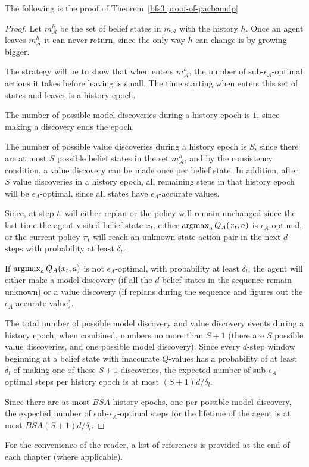 The following is the proof of Theorem~\ref{bfs3:proof-of-pacbamdp}
\begin{proof}
Let $m_\mathcal{A}^h$ be the set of belief states in $m_\mathcal{A}$ with the history $h$. Once an agent leaves $m_\mathcal{A}^h$ it can never return, since the only way $h$ can change is by growing bigger.

The strategy will be to show that when  enters $m_\mathcal{A}^h$, the number of sub-$\epsilon_A$-optimal actions it takes before leaving is small. The time starting when  enters this set of states and leaves is a history epoch.

The number of possible model discoveries during a history epoch is $1$, since making a discovery ends the epoch.

The number of possible value discoveries during a history epoch is $S$, since there are at most $S$ possible belief states in the set $m_\mathcal{A}^h$, and by the consistency condition, a value discovery can be made once per belief state. In addition, after $S$ value discoveries in a history epoch, all remaining steps in that history epoch will be $\epsilon_A$-optimal, since all states have $\epsilon_A$-accurate values.

Since, at step $t$,  will either replan or the policy will remain unchanged since the last time the agent visited belief-state $x_t$, either $\argmax_a Q_A(x_t,a)$ is $\epsilon_A$-optimal, or the current policy $\pi_t$ will reach an unknown state-action pair in the next $d$ steps with probability at least $\delta_l$.

If $\argmax_a Q_A(x_t,a)$ is not $\epsilon_A$-optimal, with probability at least $\delta_l$, the agent will either make a model discovery (if all the $d$ belief states in the sequence remain unknown) or a value discovery (if  replans during the sequence and figures out the $\epsilon_A$-accurate value).

The total number of possible model discovery and value discovery events during a history epoch, when combined, numbers no more than $S+1$ (there are $S$ possible value discoveries, and one possible model discovery). Since every $d$-step window beginning at a belief state with inaccurate $Q$-values has a probability of at least $\delta_l$ of making one of these $S+1$ discoveries, the expected number of sub-$\epsilon_A$-optimal steps per history epoch is at most $(S+1)d/\delta_l$.

Since there are at most $BSA$ history epochs, one per possible model discovery, the expected number of sub-$\epsilon_A$-optimal steps for the lifetime of the agent is at most $BSA(S+1)d/\delta_l$.
\end{proof}

%
\ifperchapterbib%
For the convenience of the reader, a list of references is provided at the end of each chapter (where applicable).
\ifendbib%
\else\fi%
\else\fi%
